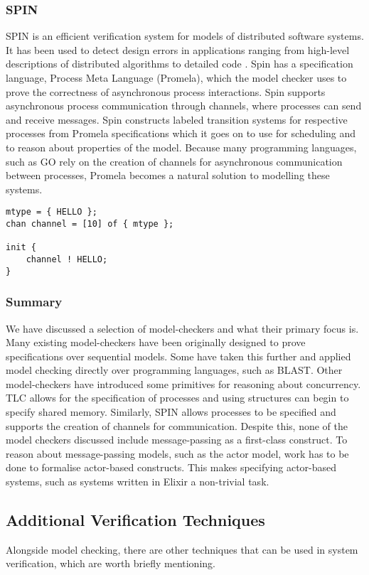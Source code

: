 \subsubsection*{\textbf{SPIN}}
SPIN is an efficient verification system for models of distributed software systems. It has been used to detect design errors in applications ranging from high-level descriptions of distributed algorithms to detailed code \cite{spin}. Spin has a specification language, Process Meta Language (Promela), which the model checker uses to prove the correctness of asynchronous process interactions. Spin supports asynchronous process communication through channels, where processes can send and receive messages. Spin constructs labeled transition systems for respective processes from Promela specifications which it goes on to use for scheduling and to reason about properties of the model. Because many programming languages, such as GO \cite{go} rely on the creation of channels for asynchronous communication between processes, Promela becomes a natural solution to modelling these systems.
\begin{lstlisting}[caption={Example of a Promela specification that enqueues a message in a channel}]
mtype = { HELLO };
chan channel = [10] of { mtype };

init {
    channel ! HELLO;
}
\end{lstlisting}
\subsubsection{Summary}
We have discussed a selection of model-checkers and what their primary focus is. Many existing model-checkers have been originally designed to prove specifications over sequential models. Some have taken this further and applied model checking directly over programming languages, such as BLAST. Other model-checkers have introduced some primitives for reasoning about concurrency. TLC allows for the specification of processes and using structures can begin to specify shared memory. Similarly, SPIN allows processes to be specified and supports the creation of channels for communication. Despite this, none of the model checkers discussed include message-passing as a first-class construct. To reason about message-passing models, such as the actor model, work has to be done to formalise actor-based constructs. This makes specifying actor-based systems, such as systems written in Elixir a non-trivial task.
\subsection{Additional Verification Techniques}
Alongside model checking, there are other techniques that can be used in system verification, which are worth briefly mentioning. 
